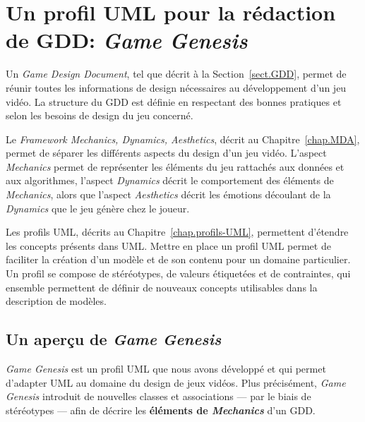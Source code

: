 \chapter{Un profil UML pour la rédaction de GDD: \emph{Game Genesis}}
\label{chap.game-genesis}
\label{game-genesis.sect}

Un \emph{Game Design Document}, tel que décrit à la Section~\ref{sect.GDD}, permet de réunir toutes les informations de design nécessaires au développement d'un jeu vidéo. La structure du GDD est définie en respectant des bonnes pratiques et selon les besoins de design du jeu concerné.



Le \emph{Framework Mechanics, Dynamics, Aesthetics}, décrit au Chapitre~\ref{chap.MDA}, permet de séparer les différents aspects du design d'un jeu vidéo. L'aspect \emph{Mechanics} permet de représenter les éléments du jeu rattachés aux données et aux algorithmes, l'aspect \emph{Dynamics} décrit le comportement des \'el\'ements de \emph{Mechanics}, alors que l'aspect \emph{Aesthetics} d\'ecrit les émotions découlant de la \emph{Dynamics} que le jeu génère chez le joueur.

Les profils UML, décrits au Chapitre~\ref{chap.profils-UML}, permettent d'étendre les concepts présents dans UML. Mettre en place un profil UML permet de faciliter la cr\'eation d'un modèle et de son contenu pour un domaine particulier. Un profil se compose de stéréotypes, de valeurs étiquetées et de contraintes, qui ensemble permettent de d\'efinir de nouveaux concepts utilisables dans la description de modèles.


\section{Un aper\c{c}u de \emph{Game Genesis}}
\label{sect.gg_what}
\emph{Game Genesis} est un profil UML que nous avons d\'evelopp\'e et qui permet d'adapter UML au domaine du design de jeux vidéos. 
Plus précisément, \emph{Game Genesis} introduit de nouvelles classes et associations --- par le biais de st\'er\'eotypes --- afin de décrire les {\bf éléments de \emph{Mechanics}} d'un GDD.

